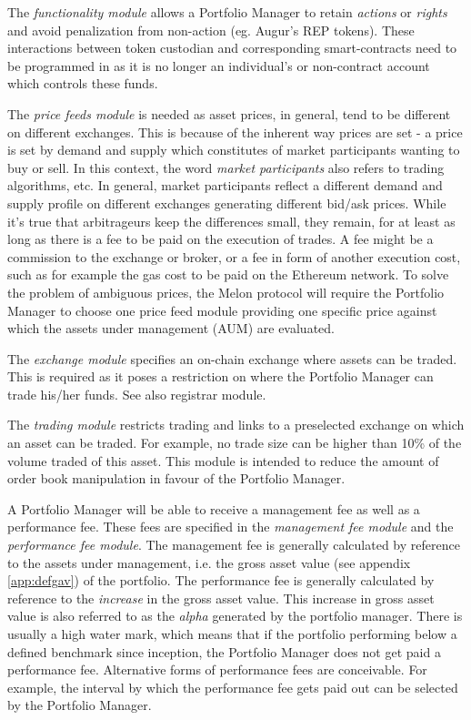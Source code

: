 \documentclass[9pt,oneside]{amsart}
\theoremstyle{plain}
\begin{document}
\begin{multicols}{2}
The \textit{functionality module} allows a Portfolio Manager to retain \textit{actions} or \textit{rights} and avoid penalization from non-action (eg. Augur’s REP tokens). These interactions between token custodian and corresponding smart-contracts need to be programmed in as it is no longer an individual's or non-contract account which controls these funds.

The \textit{price feeds module} is needed as asset prices, in general, tend to be different on different exchanges. This is because of the inherent way prices are set - a price is set by demand and supply which constitutes of market participants wanting to buy or sell. In this context, the word \textit{market participants} also refers to trading algorithms, etc. In general, market participants reflect a different demand and supply profile on different exchanges generating different bid/ask prices. While it's true that arbitrageurs keep the differences small, they remain, for at least as long as there is a fee to be paid on the execution of trades. A fee might be a commission to the exchange or broker, or a fee in form of another execution cost, such as for example the gas cost to be paid on the Ethereum network. To solve the problem of ambiguous prices, the Melon protocol will require the Portfolio Manager to choose one price feed module providing one specific price against which the assets under management (AUM) are evaluated.

The \textit{exchange module} specifies an on-chain exchange where assets can be traded. This is required as it poses a restriction on where the Portfolio Manager can trade his/her funds. See also registrar module.

The \textit{trading module} restricts trading and links to a preselected exchange on which an asset can be traded. For example, no trade size can be higher than 10\% of the volume traded of this asset. This module is intended to reduce the amount of order book manipulation in favour of the Portfolio Manager.

A Portfolio Manager will be able to receive a management fee as well as a performance fee. These fees are specified in the \textit{management fee module} and the \textit{performance fee module}. The management fee is generally calculated by reference to the assets under management, i.e. the gross asset value (see appendix \ref{app:defgav}) of the portfolio. The performance fee is generally calculated by reference to the \textit{increase} in the gross asset value. This increase in gross asset value is also referred to as the \textit{alpha} generated by the portfolio manager. There is usually a high water mark, which means that if the portfolio performing below a defined benchmark since inception, the Portfolio Manager does not get paid a performance fee. Alternative forms of performance fees are conceivable. For example, the interval by which the performance fee gets paid out can be selected by the Portfolio Manager.


\end{multicols}
\end{document}
